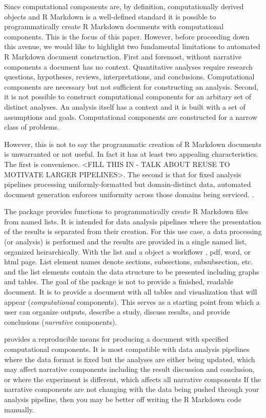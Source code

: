 Since computational components are, by definition, computationally
derived objects and R Markdown is a well-defined standard it is possible
to programmatically create R Markdown documents with computational
components. This is the focus of this paper. However, before proceeding
down this avenue, we would like to highlight two fundamental limitations
to automated R Markdown document construction. First and foremost,
without narrative components a document has no context. Quantitative
analyses require research questions, hypotheses, reviews,
interpretations, and conclusions. Computational components are necessary
but not sufficient for constructing an analysis. Second, it is not
possible to construct computational components for an arbitary set of
distinct analyses. An analysis itself has a context and it is built with
a set of assumptions and goals. Computational components are constructed
for a narrow class of problems.

However, this is not to say the programmatic creation of R Markdown
documents is unwarranted or not useful. In fact it has at least two
appealing characteristics. The first is convenience. \textless FILL THIS
IN - TALK ABOUT REUSE TO MOTIVATE LARGER PIPELINES\textgreater. The
second is that for fixed analysis pipelines processing
uniformly-formatted but domain-distinct data, automated document
generation enforces uniformity across those domains being serviced. .

The  package provides functions to programmatically create
R Markdown files from named lists. It is intended for data analysis
pipelines where the presentation of the results is separated from their
creation. For this use case, a data processing (or analysis) is
performed and the results are provided in a single named list, organized
heirarchically. With the list and a  object a workflowr
\citep{blischak2019}, pdf, word, or html page. List element names denote
sections, subsections, subsubsection, etc. and the list elements contain
the data structure to be presented including graphs and tables. The goal
of the package is not to provide a finished, readable document. It is to
provide a document with all tables and visualization that will appear
(\emph{computational} components). This serves as a starting point from
which a user can organize outputs, describe a study, discuss results,
and provide conclusions (\emph{narrative} components).

 provides a reproducible means for producing a document
with specified computational components. It is most compatible with data
analysis pipelines where the data format is fixed but the analyses are
either being updated, which may affect narrative components including
the result discussion and conclusion, or where the experiment is
different, which affects all narrative components If the narrative
components are not changing with the data being pushed through your
analysis pipeline, then you may be better off writing the R Markdown
code manually.

